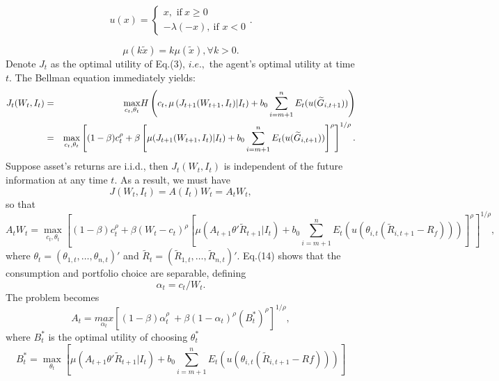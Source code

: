 \documentclass[ukenglish,nottitlepage,thmsb,11pt,letterpaper]{article}
\begin{document}
\begin{equation}
u(x)=\left\{
\begin{array}{c}
x,\text{ if}\ x\geq 0 \\
-\lambda (-x) ,\ \text{if }%
x<0%
\end{array}%
\right..
\end{equation}%

\begin{equation}
\mu(k \widetilde{x} )= k \mu (\widetilde{x}), \forall k>0.
\end{equation}
Denote $J_t$ as the optimal utility of Eq.(3), $i.e.,$ the agent's optimal utility at time $t$. The Bellman equation immediately yields:
\begin{eqnarray*}
J_t (W_t, I_t) &=& \underset{c_t, \theta_t}{\max} H\left( c_t, \mu \left(J_{t+1} (W_{t+1}, I_t) \vert I_t \right) +  b_0 \sum_{i = m+1}^{n}E_t ( u(\widetilde{G}_{i,t+1}) ) \right)
\cr
&=& \underset{c_t, \theta_t}{\max} \left[ (1-\beta) c_t^ \rho + \beta \left[ \mu  (J_{t+1} (W_{t+1}, I_t) \vert I_t ) +  b_0 \sum_{i = m+1}^{n}E_t ( u(\widetilde{G}_{i,t+1}) ) \right]^ \rho\right]^{1/\rho}.
\end{eqnarray*}
Suppose asset's returns are i.i.d., then $J_t (W_t, I_t)$ is independent of the future information at any time $t$. As a result, we must have
\begin{equation}
J(W_t,I_t) = A(I_t)W_t = A_t W_t,
\end{equation}
so that
\begin{equation}
A_t W_t =  \underset{c_t, \theta_t}{\max} \left[ (1-\beta) c_t^ \rho + \beta (W_t-c_t)^{\rho} \left[ \mu (A_{t+1} \theta' \widetilde{R}_{t+1} \vert I_t ) +  b_0 \sum_{i = m+1}^{n}E_t ( u(\theta_{i,t} (\widetilde{R}_{i,t+1} - R_f)) ) \right]^ \rho\right]^{1/\rho},
\end{equation}
where $\theta_t = (\theta_{1,t}, \dots, \theta_{n,t})'$ and $\widetilde{R}_t = (\widetilde{R}_{1,t}, \dots, \widetilde{R}_{n,t})'$.
Eq.(14) shows that the consumption and portfolio choice are separable, defining
\begin{equation*}
\alpha_t = c_t / W_t.
\end{equation*}
The problem becomes
\begin{equation}
A_t = \underset{\alpha_t}{max} \left[ (1-\beta) \alpha_t ^{\rho}\ + \beta (1-\alpha_t)^\rho (B^*_{t})^\rho \right]^{1/\rho},
\end{equation}
where $B^*_{t}$ is the optimal utility of choosing $\theta_t ^*$
\begin{equation}
B^*_{t} = \underset {\theta_t}{\max} \left[ \mu (A_{t+1} \theta' \widetilde{R}_{t+1} \vert I_t ) +  b_0 \sum_{i = m+1}^{n}E_t ( u(\theta_{i,t} (\widetilde{R}_{i,t+1} - Rf) )) \right]
\end{equation}
\end{document}
